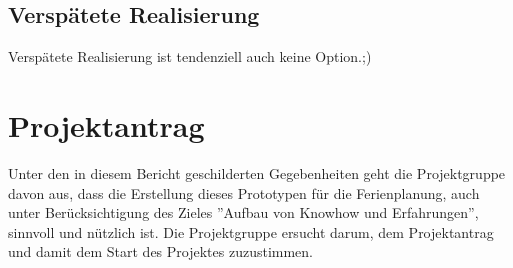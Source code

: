 \subsection{Versp\"atete Realisierung}
Versp\"atete Realisierung ist tendenziell auch keine Option.;)

\section{Projektantrag}
Unter den in diesem Bericht geschilderten Gegebenheiten geht die Projektgruppe davon aus, dass die Erstellung dieses Prototypen f\"ur die Ferienplanung, auch unter Ber\"ucksichtigung des Zieles ''Aufbau von Knowhow und Erfahrungen'', sinnvoll und n\"utzlich ist. Die Projektgruppe ersucht darum, dem Projektantrag und damit dem Start des Projektes zuzustimmen.
